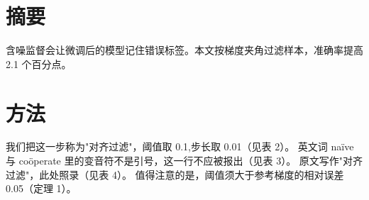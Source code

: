 \documentclass{ctexart}
\begin{document}
\section*{摘要}
含噪监督会让微调后的模型记住错误标签。本文按梯度夹角过滤样本，准确率提高 2.1 个百分点。

\section{方法}
我们把这一步称为"对齐过滤"，阈值取 0.1,步长取 0.01（见表 2）。
英文词 na\"ive 与 co\"operate 里的变音符不是引号，这一行不应被报出（见表 3）。
原文写作"对齐过滤"，此处照录（见表 4）。 %
值得注意的是，阈值须大于参考梯度的相对误差 0.05（定理 1）。
\end{document}
